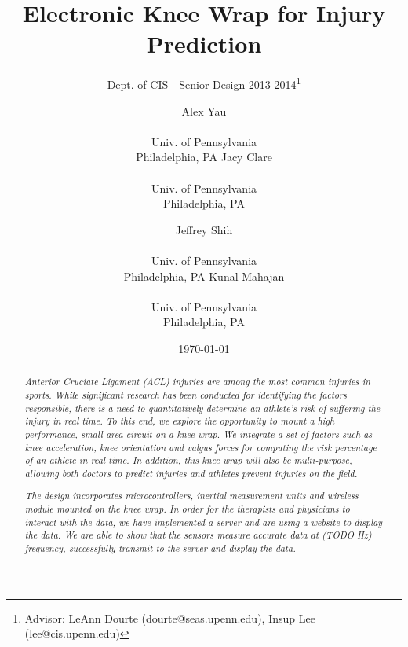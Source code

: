 \documentclass{sig-alternate}
\begin{document}
\nocite{*}
\title{Electronic Knee Wrap for Injury Prediction}
\subtitle{Dept. of CIS - Senior Design 2013-2014\thanks{Advisor: LeAnn Dourte (dourte@seas.upenn.edu), Insup Lee (lee@cis.upenn.edu)}}
\author{
\alignauthor Alex Yau \\  \\ Univ. of Pennsylvania \\ Philadelphia, PA
\alignauthor Jacy Clare \\  \\ Univ. of Pennsylvania \\ Philadelphia, PA
\and
\alignauthor Jeffrey Shih \\  \\ Univ. of Pennsylvania \\ Philadelphia, PA
\alignauthor Kunal Mahajan \\  \\ Univ. of Pennsylvania \\ Philadelphia, PA}
\date{\today}
\maketitle

\begin{abstract}

  \textit{Anterior Cruciate Ligament (ACL) injuries are among the most common injuries in sports. While significant research has been conducted for identifying the factors responsible, there is a need to quantitatively determine an athlete's risk of suffering the injury in real time. To this end, we explore the opportunity to mount a high performance, small area circuit on a knee wrap. We integrate a set of factors such as knee acceleration, knee orientation and valgus forces for computing the risk percentage of an athlete in real time. In addition, this knee wrap will also be multi-purpose, allowing both doctors to predict injuries and athletes prevent injuries on the field.}

  \textit{The design incorporates microcontrollers, inertial measurement units and wireless module mounted on the knee wrap. In order for the therapists and physicians to interact with the data, we have implemented a server and are using a website to display the data. We are able to show that the sensors measure accurate data at (TODO Hz) frequency, successfully transmit to the server and display the data.}

\end{abstract}
\end{document}
